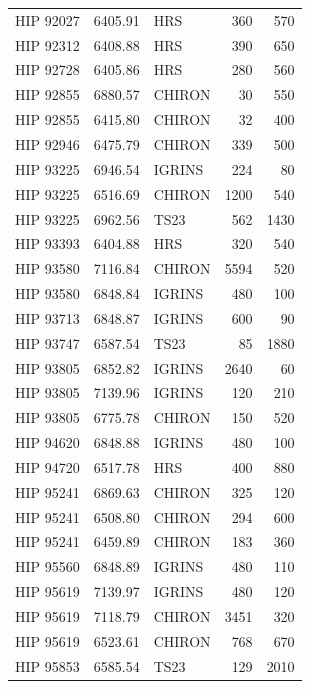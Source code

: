 {\begin{scriptsize}
\begin{longtable}{|l|rlrr|}
   HIP 92027 &  6405.91 &        HRS &      360 &   570 \\
   HIP 92312 &  6408.88 &        HRS &      390 &   650 \\
   HIP 92728 &  6405.86 &        HRS &      280 &   560 \\
   HIP 92855 &  6880.57 &     CHIRON &       30 &   550 \\
   HIP 92855 &  6415.80 &     CHIRON &       32 &   400 \\
   HIP 92946 &  6475.79 &     CHIRON &      339 &   500 \\
   HIP 93225 &  6946.54 &     IGRINS &      224 &    80 \\
   HIP 93225 &  6516.69 &     CHIRON &     1200 &   540 \\
   HIP 93225 &  6962.56 &       TS23 &      562 &  1430 \\
   HIP 93393 &  6404.88 &        HRS &      320 &   540 \\
   HIP 93580 &  7116.84 &     CHIRON &     5594 &   520 \\
   HIP 93580 &  6848.84 &     IGRINS &      480 &   100 \\
   HIP 93713 &  6848.87 &     IGRINS &      600 &    90 \\
   HIP 93747 &  6587.54 &       TS23 &       85 &  1880 \\
   HIP 93805 &  6852.82 &     IGRINS &     2640 &    60 \\
   HIP 93805 &  7139.96 &     IGRINS &      120 &   210 \\
   HIP 93805 &  6775.78 &     CHIRON &      150 &   520 \\
   HIP 94620 &  6848.88 &     IGRINS &      480 &   100 \\
   HIP 94720 &  6517.78 &        HRS &      400 &   880 \\
   HIP 95241 &  6869.63 &     CHIRON &      325 &   120 \\
   HIP 95241 &  6508.80 &     CHIRON &      294 &   600 \\
   HIP 95241 &  6459.89 &     CHIRON &      183 &   360 \\
   HIP 95560 &  6848.89 &     IGRINS &      480 &   110 \\
   HIP 95619 &  7139.97 &     IGRINS &      480 &   120 \\
   HIP 95619 &  7118.79 &     CHIRON &     3451 &   320 \\
   HIP 95619 &  6523.61 &     CHIRON &      768 &   670 \\
   HIP 95853 &  6585.54 &       TS23 &      129 &  2010 \\

\end{longtable}
\end{scriptsize}}
